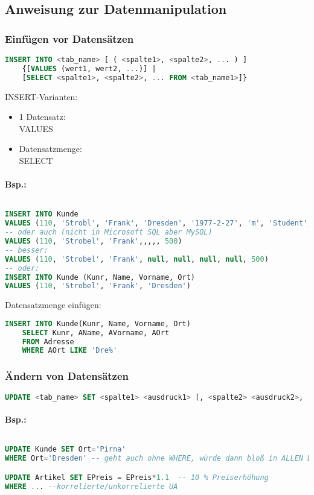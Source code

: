 \subsection{Anweisung zur Datenmanipulation}
\subsubsection{Einfügen vor Datensätzen}
\begin{lstlisting}[language=SQL]
INSERT INTO <tab_name> [ ( <spalte1>, <spalte2>, ... ) ]
	{[VALUES (wert1, wert2, ...)] | 
	[SELECT <spalte1>, <spalte2>, ... FROM <tab_name1>]}
\end{lstlisting}
INSERT-Varianten:
\begin{itemize}
\item 1 Datensatz:\\
VALUES
\item Datensatzmenge:\\
SELECT
\end{itemize}
\paragraph{Bsp.:} $ $
\begin{lstlisting}[language=SQL]
INSERT INTO Kunde
VALUES (110, 'Strobl', 'Frank', 'Dresden', '1977-2-27', 'm', 'Student', 500)
-- oder auch (nicht in Microsoft SQL aber MySQL)
VALUES (110, 'Strobel', 'Frank',,,,, 500)
-- besser:
VALUES (110, 'Strobel', 'Frank', null, null, null, null, 500)
-- oder:
INSERT INTO Kunde (Kunr, Name, Vorname, Ort)
VALUES (110, 'Strobel', 'Frank', 'Dresden')
\end{lstlisting}
Datensatzmenge einfügen:
\begin{lstlisting}[language=SQL]
INSERT INTO Kunde(Kunr, Name, Vorname, Ort)
	SELECT Kunr, AName, AVorname, AOrt
	FROM Adresse
	WHERE AOrt LIKE 'Dre%'
\end{lstlisting}
\subsubsection{Ändern von Datensätzen}
\begin{lstlisting}[language=SQL]
UPDATE <tab_name> SET <spalte1> <ausdruck1> [, <spalte2> <ausdruck2>, ...]
\end{lstlisting}
\paragraph{Bsp.:} $ $
\begin{lstlisting}[language=SQL]
UPDATE Kunde SET Ort='Pirna'
WHERE Ort='Dresden' -- geht auch ohne WHERE, würde dann bloß in ALLEN Datensätze Ort auf Pirna setzen.

UPDATE Artikel SET EPreis = EPreis*1.1	-- 10 % Preiserhöhung
WHERE ... --korrelierte/unkorrelierte UA
\end{lstlisting}
